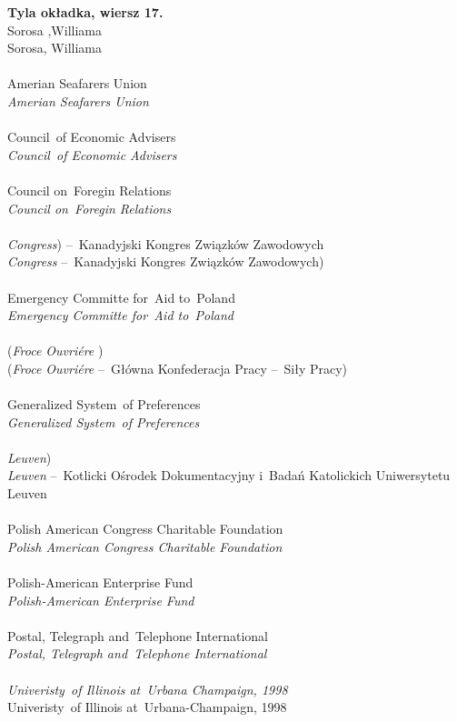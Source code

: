 \documentclass[a4paper,11pt]{article}
\begin{document}
\noindent
\textbf{Tyla okładka, wiersz 17.} \\
\Jest Sorosa ,Williama \\
\Powin Sorosa, Williama \\
 \\
\Jest  Amerian Seafarers Union \\
\Powin \textit{Amerian Seafarers Union} \\
 \\
\Jest  Council~of Economic Advisers \\
\Powin \textit{Council~of Economic Advisers} \\
 \\
\Jest  Council on~Foregin Relations \\
\Powin \textit{Council on~Foregin Relations} \\
 \\
\Jest  \textit{Congress}) --~Kanadyjski Kongres Związków Zawodowych \\
\Powin \textit{Congress} --~Kanadyjski Kongres Związków Zawodowych) \\
 \\
\Jest  Emergency Committe for~Aid to~Poland \\
\Powin \textit{Emergency Committe for~Aid to~Poland} \\
 \\
\Jest  (\textit{Froce Ouvri\'{e}re} ) \\
\Powin (\textit{Froce Ouvri\'{e}re} --~Główna Konfederacja Pracy --~Siły
Pracy) \\
 \\
\Jest  Generalized System~of Preferences \\
\Powin \textit{Generalized System~of Preferences} \\
 \\
\Jest  \textit{Leuven}) \\
\Powin \textit{Leuven} --~Kotlicki Ośrodek Dokumentacyjny i~Badań
Katolickich Uniwersytetu Leuven \\
 \\
\Jest  Polish American Congress Charitable Foundation \\
\Powin \textit{Polish American Congress Charitable Foundation} \\
 \\
\Jest  Polish-American Enterprise Fund \\
\Powin \textit{Polish-American Enterprise Fund} \\
 \\
\Jest  Postal, Telegraph and~Telephone International \\
\Powin \textit{Postal, Telegraph and~Telephone International} \\
 \\
\Jest  \textit{Univeristy~of Illinois at~Urbana Champaign, 1998} \\
\Powin Univeristy~of Illinois at~Urbana-Champaign, 1998 \\
\end{document}
